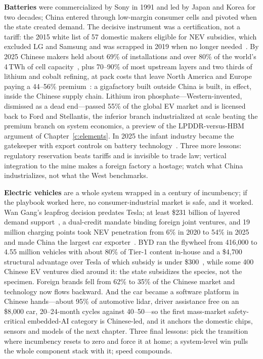 \textbf{Batteries} were commercialized by Sony in 1991 and led by Japan and Korea for two decades; China entered through low-margin consumer cells and pivoted when the state created demand. The decisive instrument was a certification, not a tariff: the 2015 white list of 57 domestic makers eligible for NEV subsidies, which excluded LG and Samsung and was scrapped in 2019 when no longer needed~\cite{white-list}. By 2025 Chinese makers held about 69\% of installations and over 80\% of the world's 4\,TWh of cell capacity~\cite{sne-2025,iea-gevo-2026}, plus 70--90\% of most upstream layers and two thirds of lithium and cobalt refining, at pack costs that leave North America and Europe paying a 44--56\% premium~\cite{bnef-2025}: a gigafactory built outside China is built, in effect, inside the Chinese supply chain. Lithium iron phosphate---Western-invented, dismissed as a dead end---passed 55\% of the global EV market and is licensed back to Ford and Stellantis, the inferior branch industrialized at scale beating the premium branch on system economics, a preview of the LPDDR-versus-HBM argument of Chapter~\ref{c:elements}. In 2025 the infant industry became the gatekeeper with export controls on battery technology~\cite{mofcom-battery-controls}. Three more lessons: regulatory reservation beats tariffs and is invisible to trade law; vertical integration to the mine makes a foreign factory a hostage; watch what China industrializes, not what the West benchmarks.

\textbf{Electric vehicles} are a whole system wrapped in a century of incumbency; if the playbook worked here, no consumer-industrial market is safe, and it worked. Wan Gang's leapfrog decision predates Tesla; at least \$231 billion of layered demand support~\cite{csis-230b}, a dual-credit mandate binding foreign joint ventures, and 19 million charging points took NEV penetration from 6\% in 2020 to 54\% in 2025~\cite{cpca-2025} and made China the largest car exporter~\cite{caam-2025}. BYD ran the flywheel from 416,000 to 4.55 million vehicles with about 80\% of Tier-1 content in-house and a \$4,700 structural advantage over Tesla of which subsidy is under \$300~\cite{rhodium-evs}, while some 400 Chinese EV ventures died around it: the state subsidizes the species, not the specimen. Foreign brands fell from 62\% to 35\% of the Chinese market and technology now flows backward. And the car became a software platform in Chinese hands---about 95\% of automotive lidar, driver assistance free on an \$8,000 car, 20--24-month cycles against 40--50---so the first mass-market safety-critical embedded-AI category is Chinese-led, and it anchors the domestic chips, sensors and models of the next chapter. Three final lessons: pick the transition where incumbency resets to zero and force it at home; a system-level win pulls the whole component stack with it; speed compounds.

